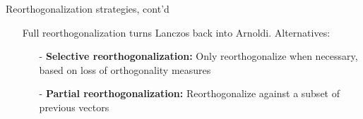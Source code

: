 \documentclass[t,usepdftitle=false]{beamer}
\begin{document}
\begin{frame}{Reorthogonalization strategies, cont'd}
\begin{itemize}
\item[]
\begin{algorithm}[H]
\small
\caption{Lanczos with full reorthogonalization}
\begin{algorithmic}[1]
 
\ENDFOR
{}
\ENDFOR
\end{algorithmic}
\end{algorithm}
\item[] Full reorthogonalization turns Lanczos back into Arnoldi.
Alternatives:
\begin{itemize}\normalsize
\item[-] \textbf{Selective reorthogonalization:} Only reorthogonalize when necessary, based on loss of orthogonality measures
\item[-] \textbf{Partial reorthogonalization:} Reorthogonalize against a subset of previous vectors
\end{itemize}
\end{itemize}
\end{frame}
\end{document}
